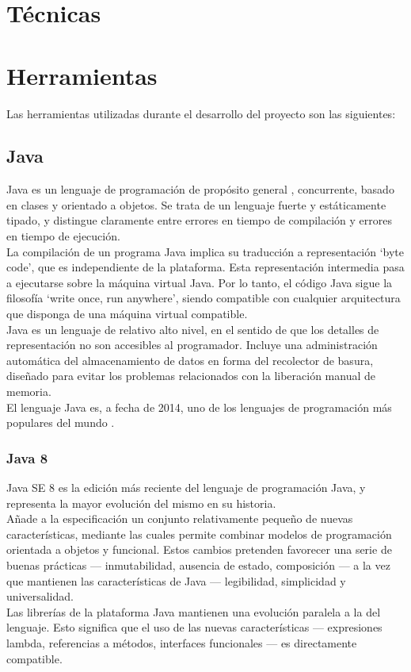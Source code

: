 
\section{Técnicas}


\section{Herramientas}

Las herramientas utilizadas durante el desarrollo del proyecto son las siguientes:

\subsection{Java}

Java es un lenguaje de programación de propósito general \cite{jls8}, concurrente, basado en clases y orientado a objetos.
Se trata de un lenguaje fuerte y estáticamente tipado, y distingue claramente entre errores en tiempo de compilación y errores en tiempo de ejecución.
\\
La compilación de un programa Java implica su traducción a representación `byte code', que es independiente de la plataforma.
Esta representación intermedia pasa a ejecutarse sobre la máquina virtual Java.
Por lo tanto, el código Java sigue la filosofía `write once, run anywhere', siendo compatible con cualquier arquitectura que disponga de una máquina virtual compatible.
\\
Java es un lenguaje de relativo alto nivel, en el sentido de que los detalles de representación no son accesibles al programador.
Incluye una administración automática del almacenamiento de datos en forma del recolector de basura, diseñado para evitar los problemas relacionados con la liberación manual de memoria.
\\
El lenguaje Java es, a fecha de 2014, uno de los lenguajes de programación más populares del mundo \cite{website:tiobe}.

\subsubsection{Java 8}

Java SE 8 es la edición más reciente del lenguaje de programación Java, y representa la mayor evolución del mismo en su historia.
\\
Añade a la especificación un conjunto relativamente pequeño de nuevas características, mediante las cuales permite combinar modelos de programación orientada a objetos y funcional.
Estos cambios pretenden favorecer una serie de buenas prácticas --- inmutabilidad, ausencia de estado, composición --- a la vez que mantienen las características de Java --- legibilidad, simplicidad y universalidad.
\\
Las librerías de la plataforma Java mantienen una evolución paralela a la del lenguaje.
Esto significa que el uso de las nuevas características --- expresiones lambda, referencias a métodos, interfaces funcionales --- es directamente compatible.
\cite{jls8}


